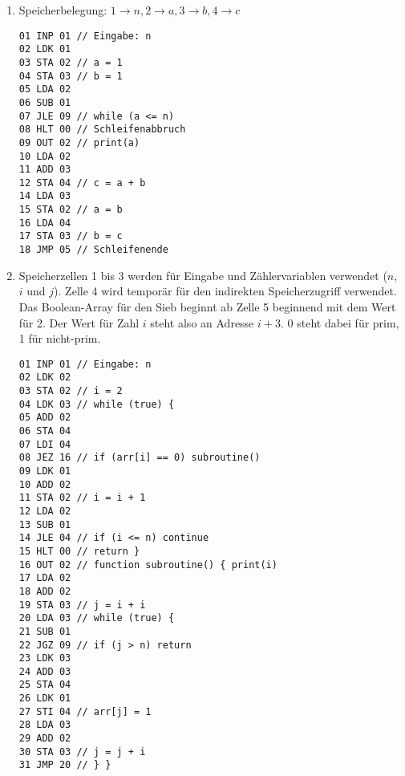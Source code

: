 \documentclass[11pt,a4paper]{article}
\begin{document}
\begin{loesung}
\begin{enumerate}[label=\alph*)]
\item Speicherbelegung: $1 \rightarrow n, 2 \rightarrow a, 3 \rightarrow b, 4 \rightarrow c$\\
\begin{minipage}{\linewidth}
\begin{lstlisting}
01 INP 01 // Eingabe: n
02 LDK 01
03 STA 02 // a = 1
04 STA 03 // b = 1
05 LDA 02 
06 SUB 01
07 JLE 09 // while (a <= n)
08 HLT 00 // Schleifenabbruch
09 OUT 02 // print(a)
10 LDA 02
11 ADD 03
12 STA 04 // c = a + b
14 LDA 03
15 STA 02 // a = b
16 LDA 04
17 STA 03 // b = c
18 JMP 05 // Schleifenende
\end{lstlisting}
\end{minipage}
\newpage
\item Speicherzellen 1 bis 3 werden für Eingabe und Zählervariablen verwendet ($n$, $i$ und $j$).
Zelle 4 wird temporär für den indirekten Speicherzugriff verwendet.
Das \glqq{}Boolean-Array\grqq{} für den Sieb beginnt ab Zelle 5 beginnend mit dem Wert für 2. 
Der Wert für Zahl $i$ steht also an Adresse $i + 3$.
0 steht dabei für prim, 1 für nicht-prim.\\
\begin{minipage}{\linewidth}
\begin{lstlisting}
01 INP 01 // Eingabe: n
02 LDK 02
03 STA 02 // i = 2
04 LDK 03 // while (true) {
05 ADD 02
06 STA 04
07 LDI 04
08 JEZ 16 // if (arr[i] == 0) subroutine()
09 LDK 01
10 ADD 02
11 STA 02 // i = i + 1
12 LDA 02
13 SUB 01 
14 JLE 04 // if (i <= n) continue
15 HLT 00 // return }
16 OUT 02 // function subroutine() { print(i)
17 LDA 02
18 ADD 02
19 STA 03 // j = i + i
20 LDA 03 // while (true) {
21 SUB 01
22 JGZ 09 // if (j > n) return
23 LDK 03
24 ADD 03
25 STA 04
26 LDK 01
27 STI 04 // arr[j] = 1
28 LDA 03
29 ADD 02
30 STA 03 // j = j + i
31 JMP 20 // } }
\end{lstlisting}
\end{minipage}
\end{enumerate}
\end{loesung}
\end{document}
